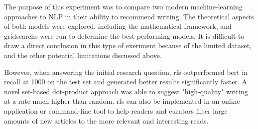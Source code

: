 The purpose of this experiment was to compare two modern machine-learning approaches to NLP in their ability to recommend writing. The theoretical aspects of both models were explored, including the mathematical framework, and gridsearchs were run to determine the best-performing models. It is difficult to draw a direct conclusion in this type of exeriment because of the limited dataset, and the other potential limitations discussed above.

However, when answering the initial research question, \acrlong{rfs} outperformed \acrshort{bert} in recall at 1000 on the test set and generated better results significantly faster. A novel set-based dot-product approach was able to suggest "high-quality" writing at a rate much higher than random. \acrshort{rfs} can also be implemented in an online application or command-line tool to help readers and curators filter large amounts of new articles to the more relevant and interesting reads.